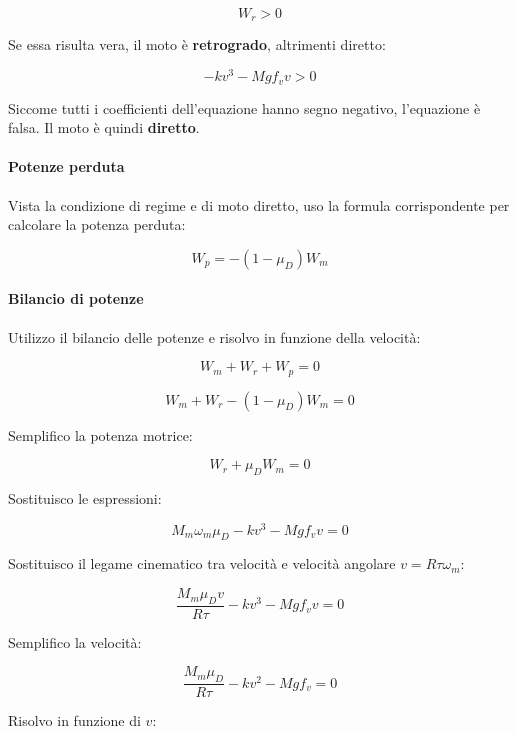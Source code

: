 \documentclass[main.tex]{subfiles}
\begin{document}
\[
  W_r > 0
\]

Se essa risulta vera, il moto è \textbf{retrogrado}, altrimenti diretto:

\[
  -kv^3 - Mgf_vv > 0
\]

Siccome tutti i coefficienti dell'equazione hanno segno negativo, l'equazione è falsa. Il moto è quindi \textbf{diretto}.

\paragraph{Potenze perduta}
Vista la condizione di regime e di moto diretto, uso la formula corrispondente per calcolare la potenza perduta:

\[
  W_p = -(1-\mu_D)W_m
\]

\paragraph{Bilancio di potenze}
Utilizzo il bilancio delle potenze e risolvo in funzione della velocità:

\begin{equation}
  W_m + W_r + W_p = 0
\end{equation}

\begin{equation}
  W_m + W_r - (1-\mu_D)W_m = 0
\end{equation}

Semplifico la potenza motrice:

\begin{equation}
  W_r +\mu_DW_m = 0
\end{equation}

Sostituisco le espressioni:

\begin{equation}
  M_m\omega_m\mu_D -kv^3 - Mgf_vv = 0
\end{equation}

Sostituisco il legame cinematico tra velocità e velocità angolare $v = R\tau\omega_m$:

\begin{equation}
  \dfrac{M_m\mu_Dv}{R\tau} -kv^3 - Mgf_vv = 0
\end{equation}

Semplifico la velocità:

\begin{equation}
  \dfrac{M_m\mu_D}{R\tau} -kv^2 - Mgf_v = 0
\end{equation}

Risolvo in funzione di $v$:
\end{document}
